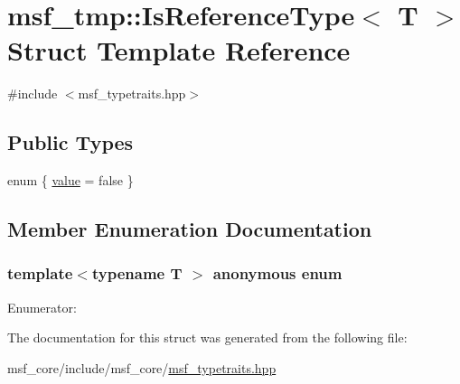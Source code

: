 \hypertarget{structmsf__tmp_1_1IsReferenceType}{\section{msf\-\_\-tmp\-:\-:Is\-Reference\-Type$<$ T $>$ Struct Template Reference}
\label{structmsf__tmp_1_1IsReferenceType}
}


{\ttfamily \#include $<$msf\-\_\-typetraits.\-hpp$>$}

\subsection*{Public Types}
\begin{DoxyCompactItemize}
\item 
enum \{ \hyperlink{structmsf__tmp_1_1IsReferenceType_a7e794dcfa733e0117131d5702ea768dea8d527d36ff4449bcf65fb1e34b6f01a5}{value} =  false
 \}
\end{DoxyCompactItemize}


\subsection{Member Enumeration Documentation}
\hypertarget{structmsf__tmp_1_1IsReferenceType_a7e794dcfa733e0117131d5702ea768de}{\subsubsection[{anonymous enum}]{\setlength{\rightskip}{0pt plus 5cm}template$<$typename T $>$ anonymous enum}}\label{structmsf__tmp_1_1IsReferenceType_a7e794dcfa733e0117131d5702ea768de}
\begin{Desc}
\item[Enumerator\-: ]\par
\begin{description}
\item[{\em 
\hypertarget{structmsf__tmp_1_1IsReferenceType_a7e794dcfa733e0117131d5702ea768dea8d527d36ff4449bcf65fb1e34b6f01a5}{value}\label{structmsf__tmp_1_1IsReferenceType_a7e794dcfa733e0117131d5702ea768dea8d527d36ff4449bcf65fb1e34b6f01a5}
}]\end{description}
\end{Desc}



The documentation for this struct was generated from the following file\-:\begin{DoxyCompactItemize}
\item 
msf\-\_\-core/include/msf\-\_\-core/\hyperlink{msf__typetraits_8hpp}{msf\-\_\-typetraits.\-hpp}\end{DoxyCompactItemize}
